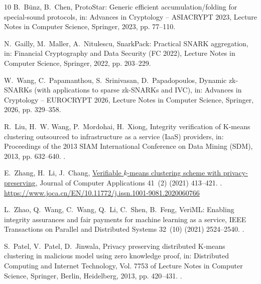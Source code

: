 \documentclass[5p,times,twocolumn]{elsarticle}
\begin{document}
\begin{thebibliography}{10}
B.~B{\"u}nz, B.~Chen, {ProtoStar}: Generic efficient accumulation/folding for special-sound protocols, in: Advances in Cryptology -- ASIACRYPT 2023, Lecture Notes in Computer Science, Springer, 2023, pp. 77--110.

N.~Gailly, M.~Maller, A.~Nitulescu, {SnarkPack}: Practical {SNARK} aggregation, in: Financial Cryptography and Data Security (FC 2022), Lecture Notes in Computer Science, Springer, 2022, pp. 203--229.

W.~Wang, C.~Papamanthou, S.~Srinivasan, D.~Papadopoulos, Dynamic {zk-SNARKs} (with applications to sparse {zk-SNARKs} and {IVC}), in: Advances in Cryptology -- EUROCRYPT 2026, Lecture Notes in Computer Science, Springer, 2026, pp. 329--358.

R.~Liu, H.~W. Wang, P.~Mordohai, H.~Xiong, Integrity verification of {K}-means clustering outsourced to infrastructure as a service ({IaaS}) providers, in: Proceedings of the 2013 SIAM International Conference on Data Mining (SDM), 2013, pp. 632--640. \newblock \href {https://doi.org/10.1137/1.9781611972832.70} {}.

E.~Zhang, H.~Li, J.~Chang,
  \href{https://www.joca.cn/EN/10.11772/j.issn.1001-9081.2020060766}{Verifiable
  $k$-means clustering scheme with privacy-preserving}, Journal of Computer
  Applications 41~(2) (2021) 413--421.
\newblock \href {https://doi.org/10.11772/j.issn.1001-9081.2020060766}
  {}.
\newline\urlprefix\url{https://www.joca.cn/EN/10.11772/j.issn.1001-9081.2020060766}

L.~Zhao, Q.~Wang, C.~Wang, Q.~Li, C.~Shen, B.~Feng, {VeriML}: Enabling integrity assurances and fair payments for machine learning as a service, IEEE Transactions on Parallel and Distributed Systems 32~(10) (2021) 2524--2540. \newblock \href {https://doi.org/10.1109/TPDS.2021.3068195} {}.


S.~Patel, V.~Patel, D.~Jinwala, Privacy preserving distributed {K}-means
  clustering in malicious model using zero knowledge proof, in: Distributed
  Computing and Internet Technology, Vol. 7753 of Lecture Notes in Computer
  Science, Springer, Berlin, Heidelberg, 2013, pp. 420--431.
\newblock \href {https://doi.org/10.1007/978-3-642-36071-8_33}
  {}.


\end{thebibliography}
\end{document}
